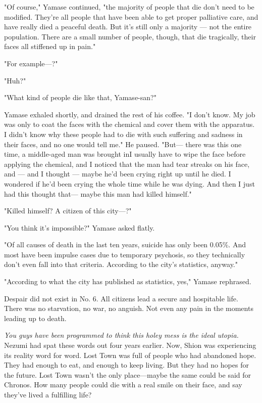 "Of course," Yamase continued, "the majority of people that die don't
need to be modified. They're all people that have been able to get
proper palliative care, and have really died a peaceful death. But it's
still only a majority --- not the entire population. There are a small
number of people, though, that die tragically, their faces all stiffened
up in pain."

"For example---?"

"Huh?"

"What kind of people die like that, Yamase-san?"

Yamase exhaled shortly, and drained the rest of his coffee. "I don't
know. My job was only to coat the faces with the chemical and cover them
with the apparatus. I didn't know why these people had to die with such
suffering and sadness in their faces, and no one would tell me." He
paused. "But--- there was this one time, a middle-aged man was brought
in\el I usually have to wipe the face before applying the chemical, and
I noticed that the man had tear streaks on his face, and --- and I thought
--- maybe he'd been crying right up until he died. I wondered if he'd been
crying the whole time while he was dying. And then I just had this
thought that--- maybe this man had killed himself."

"Killed himself? A citizen of this city---?"

"You think it's impossible?" Yamase asked flatly.

"Of all causes of death in the last ten years, suicide has only been
0.05\%. And most have been impulse cases due to temporary psychosis, so
they technically don't even fall into that criteria. According to the
city's statistics, anyway."

"According to what the city has published as statistics, yes," Yamase
rephrased.

Despair did not exist in No. 6. All citizens lead a secure and
hospitable life. There was no starvation, no war, no anguish. Not even
any pain in the moments leading up to death.

\emph{You guys have been programmed to think this holey mess is the ideal
utopia.} Nezumi had spat these words out four years earlier. Now, Shion
was experiencing its reality word for word. Lost Town was full of people
who had abandoned hope. They had enough to eat, and enough to keep
living. But they had no hopes for the future. Lost Town wasn't the only
place---maybe the same could be said for Chronos. How many people could
die with a real smile on their face, and say they've lived a fulfilling
life?

